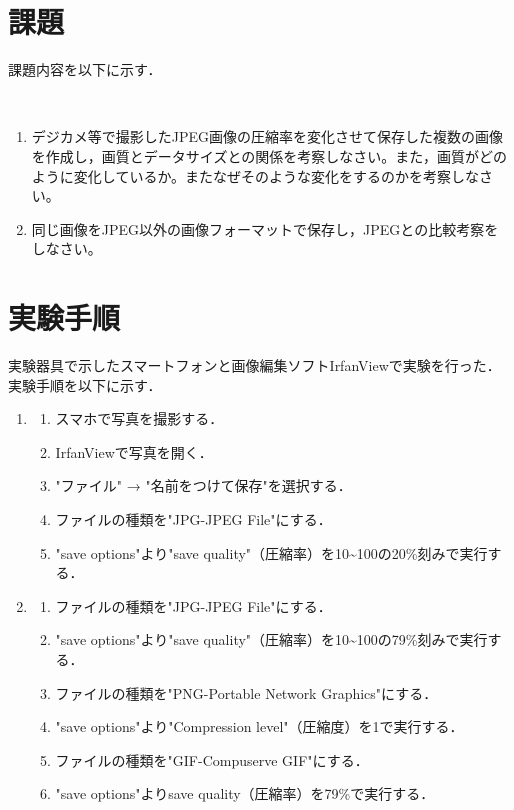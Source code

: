\documentclass[a4paper,11pt]{bxjsarticle}
\begin{document}
\section{課題}
課題内容を以下に示す．

　\begin{enumerate}
    \item デジカメ等で撮影したJPEG画像の圧縮率を変化させて保存した複数の画像を作成し，画質とデータサイズとの関係を考察しなさい。また，画質がどのように変化しているか。またなぜそのような変化をするのかを考察しなさい。
    \item 同じ画像をJPEG以外の画像フォーマットで保存し，JPEGとの比較考察をしなさい。
  \end{enumerate}



\section{実験手順}
実験器具で示したスマートフォンと画像編集ソフトIrfanViewで実験を行った．
実験手順を以下に示す．\\

\begin{enumerate}
  \item \begin{enumerate}
          \item スマホで写真を撮影する．
          \item IrfanViewで写真を開く．
          \item "ファイル" → "名前をつけて保存"を選択する．
          \item ファイルの種類を"JPG-JPEG File"にする．
          \item "save options"より"save quality"（圧縮率）を10\textasciitilde100の20\%刻みで実行する．
        \end{enumerate}
  \item \begin{enumerate}
          \item ファイルの種類を"JPG-JPEG File"にする．
          \item "save options"より"save quality"（圧縮率）を10\textasciitilde100の79\%刻みで実行する．
          \item ファイルの種類を"PNG-Portable Network Graphics"にする．
          \item "save options"より"Compression level"（圧縮度）を1で実行する．
          \item ファイルの種類を"GIF-Compuserve GIF"にする．
          \item "save options"よりsave quality（圧縮率）を79\%で実行する．
        \end{enumerate}
\end{enumerate}
\end{document}
